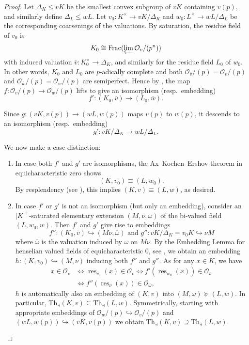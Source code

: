 \documentclass[a4paper]{amsart}
\theoremstyle{mystyle2}
\theoremstyle{mystyle}
\DeclareMathOperator{\res}{res}
\renewcommand{\O}{\mathcal{O}}
\numberwithin{equation}{section}
\begin{document}
\begin{proof}
        Let $\Delta_K\leq vK$ be the smallest convex subgroup of $vK$ containing $v(p)$, and similarly define $\Delta_L\leq wL$.
        Let $v_0\colon K^\times\to vK / \Delta_K$ and $w_0\colon L^\times\to wL / \Delta_L$ be the corresponding coarsenings of the valuations.
        By saturation, the residue field of $v_0$ is 
        \[K_0\cong \mathrm{Frac}(\varprojlim \O_v/(p^n))\]
        with induced valuation $\overline{v}\colon K_0^\times\to \Delta_K$, and similarly for the residue field $L_0$ of $w_0$.
        In other words, $K_0$ and $L_0$ are $p$-adically complete and both $\O_{\overline{v}}/(p) = \O_v/(p)$ and $\O_{\overline{w}}/(p) = \O_w/(p)$
         are  semiperfect.
        Hence by , the map $f\colon \O_v/(p)\to \O_w/(p)$ lifts to give an isomorphism (resp.\ embedding)
        \[
        f'\colon (K_0, \overline{v})\to (L_0, \overline{w}).
        \]

        Since $g\colon (vK, v(p))\to (wL, w(p))$ maps $v(p)$ to $w(p)$, it descends to an isomorphism (resp.\ embedding)
        \[
        g'\colon vK/\Delta_K\to wL /\Delta_L. 
        \]

        We now make a case distinction:
        \begin{enumerate}
        \item In case both $f'$ and $g'$ are isomorphisms, the 
        Ax--Kochen--Ershov theorem in equicharacteristic zero shows 
        \[
         (K,v_0)\equiv (L, w_0).
        \]
        By resplendency (see \cite[Proposition 2.3]{ketelsenCompositionAxKochenErshov2026}), this implies 
        $(K,v)\equiv (L,w)$, as desired.
        
        \item In case $f'$ or $g'$ is not an isomorphism (but only an embedding), consider an $|K|^+$-saturated elementary extension $(M,\nu, \omega)$
        of the bi-valued field $(L,w_0,w)$. Then $f'$ and $g'$ give rise to embeddings
        $$f'' \colon (K_0,\overline{v}) \hookrightarrow (M\nu, \overline{\omega})
        \textrm{ and } g'' \colon vK/\Delta_K = v_0K \hookrightarrow \nu M$$
        where $\overline{\omega}$ is the valuation induced by \(\omega\) on $M\nu$.
        By the Embedding Lemma for henselian valued fields of equicharacteristic $0$, see \cite[Lemma 4.6.2]{PD}, we obtain an embedding $h: (K,v_0) \hookrightarrow (M,\nu)$ inducing both $f''$ and $g''$. As for any $x \in K$, we have
        \begin{align*}
        x \in \O_v &\Longleftrightarrow {\res}_{v_0}(x) \in \O_{\overline{v}} \Longleftrightarrow f'(\res_{w_0}(x)) \in \O_{\overline{w}} \\ & \Longleftrightarrow f''(\res_\nu (x)) \in \O_{\overline{\omega}} ,
        \end{align*}
        $h$ is automatically also an embedding of $(K,v)$ into $(M,\omega) \succeq (L,w)$. In particular, $\mathrm{Th}_\exists(K,v) \subseteq \mathrm{Th}_\exists(L,w)$.
        Symmetrically, starting with appropriate 
        embeddings of $\O_w/(p) \hookrightarrow \O_v/(p)$
        and $(wL,w(p)) \hookrightarrow (vK,v(p))$ we obtain $\mathrm{Th}_\exists(K,v) \supseteq \mathrm{Th}_\exists(L,w)$.
        \end{enumerate}


\end{proof}
\end{document}
